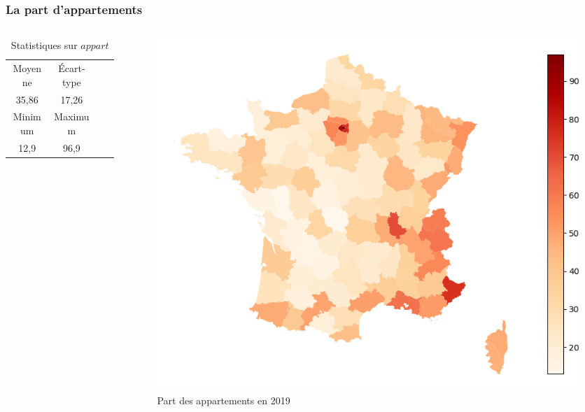 \documentclass{beamer}
\begin{document}
\begin{frame}
    \frametitle{La part d'appartements}
    \begin{columns}
    
    \begin{column}{0.5\textwidth}
    \begin{table}[H]
        \caption*{Statistiques sur $appart$}
        \begin{tabular}{cccc}
        \toprule
        Moyenne  & Écart-type   \\ 
        35,86 & 17,26   \\
        \midrule
        Minimum & Maximum   \\ 
        12,9    & 96,9      \\
        \bottomrule
        \end{tabular}
    \end{table}
    \end{column}

    \begin{column}{0.5\textwidth}
        \centering
        \begin{figure}
            \includegraphics[width=\textwidth]{appart.png}
            \caption{Part des appartements en 2019}
        \end{figure}
    \end{column}
    
    \end{columns}
\end{frame}
\end{document}
